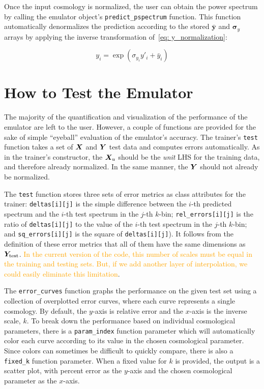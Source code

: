 Once the input cosmology is normalized, the user can obtain the power
spectrum by calling the emulator object's \verb|predict_pspectrum| function.
This function automatically denormalizes the prediction according to the
stored $\bar{\bm{y}}$ and $\bm{\sigma}_y$ arrays by applying the inverse
transformation of~\ref{eq: y_normalization}:

\begin{equation}
y_i = \exp (\sigma_{y_i} y'_i + \bar{y}_i)
\end{equation}


\section{How to Test the Emulator}
\label{sec: test_emu}

The majority of the quantification and visualization of the performance of the
emulator are left to the user. However, a couple of functions are provided for 
the sake of simple ``eyeball'' evaluation of the emulator's accuracy.
The trainer's \texttt{test} function takes a set of $\bm{X}$ and $\bm{Y}$ 
test data and computes errors automatically. As in the trainer's constructor,
the $\bm{X}_u$ should be the \textit{unit} LHS for the training data, and
therefore already normalized. In the same manner, the $\bm{Y}$ should not
already be normalized.

The \texttt{test} function stores three sets of error 
metrics as class attributes for the trainer: \texttt{deltas[i][j]}
is the simple difference between the $i$-th predicted spectrum and the
$i$-th test spectrum in the $j$-th $k$-bin;
\verb|rel_errors[i][j]| is the ratio of \texttt{deltas[i][j]} to the
value of the $i$-th test spectrum in the $j$-th $k$-bin; and
\verb|sq_errors[i][j]| is the square of \texttt{deltas[i][j]}).
It follows from the definition of these error metrics that all of them have 
the same dimensions as $\bm{Y}_\text{test}$.
\textcolor{orange}{In the current
version of the code, this number of scales must be equal in the training and
testing sets. But, if we add another layer of interpolation, we could easily
eliminate this limitation}.

The \verb|error_curves| function graphs the performance on the given test set 
using a collection of overplotted error curves, where each curve represents a 
single cosmology. By default, the $y$-axis is relative error and the
$x$-axis is the inverse scale, $k$. To break down the performance based on 
individual cosmological parameters, there is a \verb|param_index| function
parameter which will automatically color each curve according to its value in 
the chosen cosmological parameter. Since colors can sometimes be difficult to 
quickly compare, there is also a \verb|fixed_k| function parameter. When a 
fixed value for $k$ is provided, the output is a scatter 
plot, with percent error as the $y$-axis and the chosen cosmological parameter 
as the $x$-axis.

